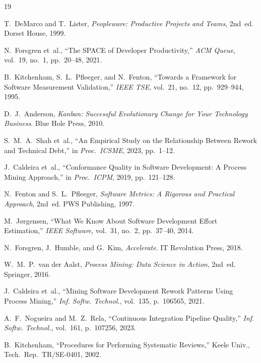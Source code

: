 \documentclass[conference]{IEEEtran}
\begin{document}
\begin{thebibliography}{19}

  T.~DeMarco and T.~Lister,
  \textit{Peopleware: Productive Projects and Teams}, 2nd~ed.
  Dorset House, 1999.

  N.~Forsgren et~al.,
  ``The SPACE of Developer Productivity,''
  \textit{ACM Queue}, vol.~19, no.~1, pp.~20--48, 2021.

  B.~Kitchenham, S.~L.~Pfleeger, and N.~Fenton,
  ``Towards a Framework for Software Measurement Validation,''
  \textit{IEEE TSE}, vol.~21, no.~12, pp.~929--944, 1995.

  D.~J.~Anderson,
  \textit{Kanban: Successful Evolutionary Change for Your Technology Business}.
  Blue Hole Press, 2010.

  S.~M.~A.~Shah et~al.,
  ``An Empirical Study on the Relationship Between Rework and Technical Debt,''
  in \textit{Proc.\ ICSME}, 2023, pp.~1--12.

  J.~Caldeira et~al.,
  ``Conformance Quality in Software Development: A Process Mining Approach,''
  in \textit{Proc.\ ICPM}, 2019, pp.~121--128.

  N.~Fenton and S.~L.~Pfleeger,
  \textit{Software Metrics: A Rigorous and Practical Approach}, 2nd~ed.
  PWS Publishing, 1997.

  M.~J{\o}rgensen,
  ``What We Know About Software Development Effort Estimation,''
  \textit{IEEE Software}, vol.~31, no.~2, pp.~37--40, 2014.

  N.~Forsgren, J.~Humble, and G.~Kim,
  \textit{Accelerate}.
  IT Revolution Press, 2018.

  W.~M.~P.~van der Aalst,
  \textit{Process Mining: Data Science in Action}, 2nd~ed.
  Springer, 2016.

  J.~Caldeira et~al.,
  ``Mining Software Development Rework Patterns Using Process Mining,''
  \textit{Inf. Softw. Technol.}, vol.~135, p.~106565, 2021.

  A.~F.~Nogueira and M.~Z.~Rela,
  ``Continuous Integration Pipeline Quality,''
  \textit{Inf. Softw. Technol.}, vol.~161, p.~107256, 2023.

  B.~Kitchenham,
  ``Procedures for Performing Systematic Reviews,''
  Keele Univ., Tech.~Rep.~TR/SE-0401, 2002.


\end{thebibliography}
\end{document}
